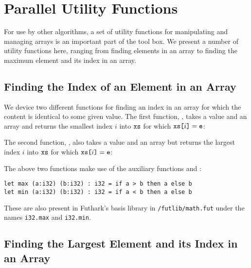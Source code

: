 \documentclass[oneside,11pt]{book}
\newenvironment{wrap}{\vspace{\topskip}\par\noindent\begin{minipage}{\linewidth}}{\end{minipage}\par}
\begin{document}
\begin{wrap}

\end{wrap}

\section{Parallel Utility Functions}
For use by other algorithms, a set of utility functions for
manipulating and managing arrays is an important part of the tool
box. We present a number of utility functions here, ranging from
finding elements in an array to finding the maximum element and its
index in an array.

\subsection{Finding the Index of an Element in an Array}
We device two different functions for finding an index in an array for
which the content is identical to some given value. The first function,
, takes a value  and an array  and
returns the smallest index $i$ into $\texttt{xs}$ for which $\texttt{xs[}i\texttt{]} =
\texttt{e}$:

\begin{wrap}

\end{wrap}

The second function,
, also takes a value  and an array  but
returns the largest index $i$ into $\texttt{xs}$ for which $\texttt{xs[}i\texttt{]} =
\texttt{e}$:

\begin{wrap}

\end{wrap}

The above two functions make use of the auxiliary functions  and
:

\begin{lstlisting}
let max (a:i32) (b:i32) : i32 = if a > b then a else b
let min (a:i32) (b:i32) : i32 = if a < b then a else b
\end{lstlisting}

These are also present in Futhark's basis library in
\texttt{/futlib/math.fut} under the names \lstinline{i32.max} and
\lstinline{i32.min}.

\subsection{Finding the Largest Element and its Index in an Array}
\end{document}
